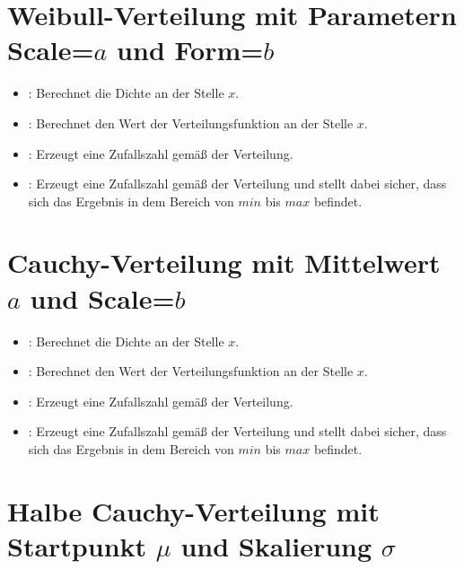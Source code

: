 \section{Weibull-Verteilung mit Parametern Scale=\texorpdfstring{$a$}{a} und Form=\texorpdfstring{$b$}{b}}

\begin{itemize}

\item
{}:
Berechnet die Dichte an der Stelle $x$.

\item
{}:
Berechnet den Wert der Verteilungsfunktion an der Stelle $x$.

\item
{}:
Erzeugt eine Zufallszahl gemäß der Verteilung.

\item
{}:
Erzeugt eine Zufallszahl gemäß der Verteilung und stellt dabei sicher, dass sich das Ergebnis in dem Bereich von $min$ bis $max$ befindet.

\end{itemize}



\section{Cauchy-Verteilung mit Mittelwert \texorpdfstring{$a$}{a} und Scale=\texorpdfstring{$b$}{b}}

\begin{itemize}

\item
{}:
Berechnet die Dichte an der Stelle $x$.

\item
{}:
Berechnet den Wert der Verteilungsfunktion an der Stelle $x$.

\item
{}:
Erzeugt eine Zufallszahl gemäß der Verteilung.

\item
{}:
Erzeugt eine Zufallszahl gemäß der Verteilung und stellt dabei sicher, dass sich das Ergebnis in dem Bereich von $min$ bis $max$ befindet.

\end{itemize}



\section{Halbe Cauchy-Verteilung mit Startpunkt \texorpdfstring{$\mu$}{mu} und Skalierung \texorpdfstring{$\sigma$}{sigma}}

